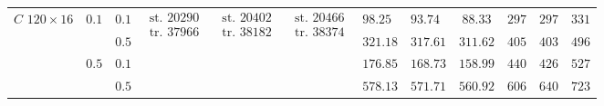\begin{table}[t]
{\begin{tabular}{|c|c|c|c|c|c|g|h|c|g|h|c|}
       &  & $0.1$ &  &   &   & $98.25$ & $93.74$ & $88.33$ & $297$ & $297$ & $331$\\ \hhline{|~|~|-|~|~|~|-|-|-|-|-|-|}
       & & $0.5$ & & & & $321.18$ & $317.61$ & $311.62$ & $405$ & $403$ & $496$\\ \hhline{|~|-|-|~|~|~|-|-|-|-|-|-|}
       &  & $0.1$ & & & & $176.85$ & $168.73$ & $158.99$ & $440$ & $426$ & $527$\\ \hhline{|~|~|-|~|~|~|-|-|-|-|-|-|}
       & & $0.5$ & & & & $578.13$ & $571.71$ & $560.92$ & $606$ & $640$ & $723$\\ 

      \hline
    \end{tabular}
  }
\end{table}

